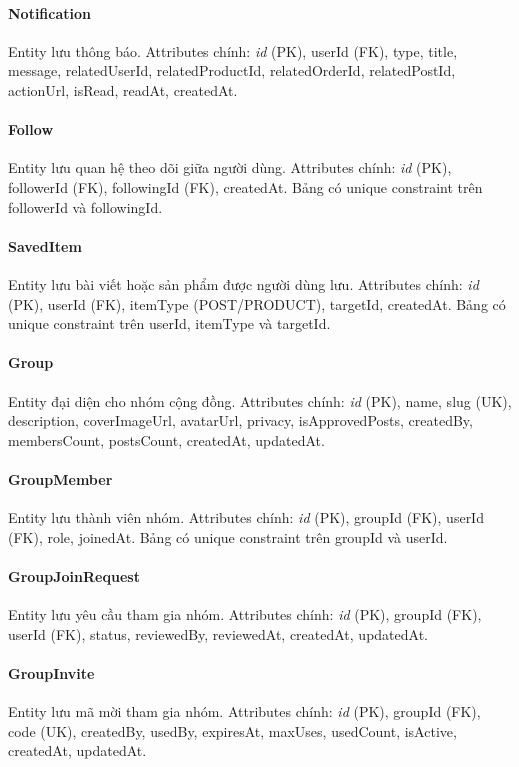 \paragraph{Notification} Entity lưu thông báo. Attributes chính: \textit{id} (PK), userId (FK), type, title, message, relatedUserId, relatedProductId, relatedOrderId, relatedPostId, actionUrl, isRead, readAt, createdAt.

\paragraph{Follow} Entity lưu quan hệ theo dõi giữa người dùng. Attributes chính: \textit{id} (PK), followerId (FK), followingId (FK), createdAt. Bảng có unique constraint trên followerId và followingId.

\paragraph{SavedItem} Entity lưu bài viết hoặc sản phẩm được người dùng lưu. Attributes chính: \textit{id} (PK), userId (FK), itemType (POST/PRODUCT), targetId, createdAt. Bảng có unique constraint trên userId, itemType và targetId.

\paragraph{Group} Entity đại diện cho nhóm cộng đồng. Attributes chính: \textit{id} (PK), name, slug (UK), description, coverImageUrl, avatarUrl, privacy, isApprovedPosts, createdBy, membersCount, postsCount, createdAt, updatedAt.

\paragraph{GroupMember} Entity lưu thành viên nhóm. Attributes chính: \textit{id} (PK), groupId (FK), userId (FK), role, joinedAt. Bảng có unique constraint trên groupId và userId.

\paragraph{GroupJoinRequest} Entity lưu yêu cầu tham gia nhóm. Attributes chính: \textit{id} (PK), groupId (FK), userId (FK), status, reviewedBy, reviewedAt, createdAt, updatedAt.

\paragraph{GroupInvite} Entity lưu mã mời tham gia nhóm. Attributes chính: \textit{id} (PK), groupId (FK), code (UK), createdBy, usedBy, expiresAt, maxUses, usedCount, isActive, createdAt, updatedAt.

